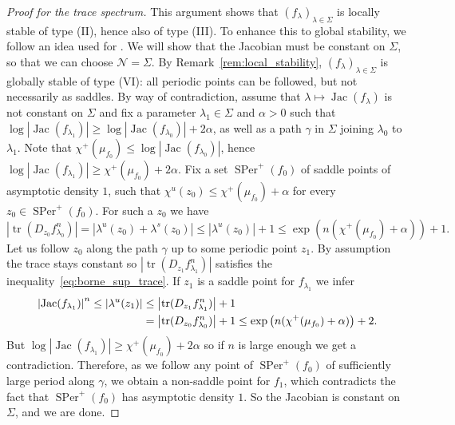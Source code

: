 \documentclass[oneside, 12pt]{amsart}
\newcommand{\abs}[1]{\left\vert#1\right\vert}
\newcommand{\lrpar}[1]{\left(#1\right)}
\newcommand{\la}{\lambda}
\DeclareMathOperator{\tr}{tr}
\DeclareMathOperator{\jac}{Jac}
\DeclareMathOperator{\SPer}{SPer}
\theoremstyle{plain}
\theoremstyle{definition}
\numberwithin{equation}{section}       %
\numberwithin{equation}{section}       %
\begin{document}
\begin{proof}[Proof for the trace spectrum]
This argument shows that $(f_\lambda)_{\la\in \Sigma}$ is  locally stable of type (II),
hence also of type (III). To enhance this to global stability, 
we follow an idea used for \cite[Prop. 8.6]{rigidity}.
We will show that the Jacobian must be constant on $\Sigma$, so that we can choose $\mathcal N  = \Sigma$.  
By Remark~\ref{rem:local_stability},  $(f_\lambda)_{\la\in \Sigma}$ is globally stable of type (VI):
 all periodic points can be followed, but not necessarily as saddles. By way of contradiction, assume that 
 $\lambda \mapsto \jac(f_\lambda)$ is not constant on $\Sigma$ and fix a parameter $\lambda_1\in \Sigma$ and 
 $\alpha>0$ such that $\log \abs{\jac(f_{\lambda_1})} \geq \log \abs{\jac(f_{\lambda_0})} + 2\alpha$, 
 as well as a path $\gamma$  in $\Sigma$ joining $\lambda_0$ to $\lambda_1$. 
 Note that $\chi^+(\mu_{f_0})\leq \log \abs{\jac(f_{\lambda_0})}$, hence 
 $\log \abs{\jac(f_{\lambda_1})} \geq \chi^+(\mu_{f_0})+2\alpha$. Fix 
 a  set $\SPer^+(f_0)$ of  saddle points  of asymptotic density $1$, such that $\chi^u(z_0)\leq \chi^+(\mu_{f_0}) + \alpha$ for 
every $z_0\in \SPer^+(f_0)$. 
For such a $z_0$ we have 
\begin{equation}\label{eq:borne_sup_trace}
\abs{\tr(D_{z_0} f_{\lambda_0}^n)} = \abs{\lambda^u(z_0) +\lambda^s(z_0)}
 \leq  \abs{\lambda^u(z_0) }+ 1 \leq \exp\lrpar{n (\chi^+(\mu_{f_0}) + \alpha)} +1.
\end{equation}
Let us follow $z_0$ along the path $\gamma$ up to some periodic point $z_1$. By assumption the trace stays constant so $\abs{\tr(D_{z_1} f_{\lambda_1}^n)}$ satisfies the inequality~\eqref{eq:borne_sup_trace}. If $z_1$ is a saddle point for $f_{\lambda_1}$
 we infer 
\begin{align}
\abs{\jac(f_{\lambda_1})} ^n\leq  \abs{\lambda^u(z_1) } &\leq \abs{\tr(D_{z_1} f_{\lambda_1}^n)} +1\\
&\notag =\abs{\tr(D_{z_0} f_{\lambda_0}^n)} +1 \leq \exp\lrpar{n (\chi^+(\mu_{f_0}) + \alpha)} +2.
\end{align}
But  $\log \abs{\jac(f_{\lambda_1})} \geq \chi^+(\mu_{f_0})+2\alpha$ so if $n$ is large enough we get a contradiction. Therefore, as we follow any point of $\SPer^+(f_0)$ of sufficiently large period along $\gamma$, we obtain a non-saddle point for $f_1$, which contradicts 
 the fact that $\SPer^+(f_0)$ has asymptotic density $1$. So 
 the Jacobian is constant on $\Sigma$, and we are done. 
 \end{proof}
\end{document}

